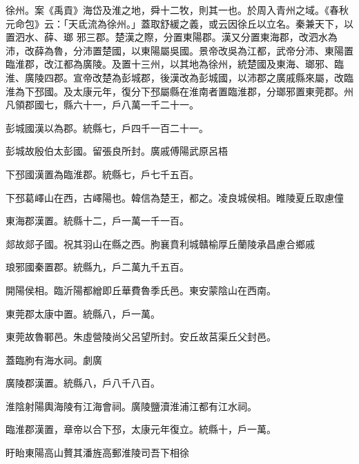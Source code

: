 \begin{pinyinscope}
 徐州。案《禹貢》海岱及淮之地，舜十二牧，則其一也。於周入青州之域。《春秋元命包》云：「天氐流為徐州。」蓋取舒緩之義，或云因徐丘以立名。秦兼天下，以置泗水、薛、瑯
 邪三郡。楚漢之際，分置東陽郡。漢又分置東海郡，改泗水為沛，改薛為魯，分沛置楚國，以東陽屬吳國。景帝改吳為江都，武帝分沛、東陽置臨淮郡，改江都為廣陵。及置十三州，以其地為徐州，統楚國及東海、瑯邪、臨淮、廣陵四郡。宣帝改楚為彭城郡，後漢改為彭城國，以沛郡之廣戚縣來屬，改臨淮為下邳國。及太康元年，復分下邳屬縣在淮南者置臨淮郡，分瑯邪置東莞郡。州凡領郡國七，縣六十一，戶八萬一千二十一。



 彭城國漢以為郡。統縣七，戶四千一百二十一。



 彭城故殷伯太彭國。留張良所封。廣戚傅陽武原呂梧



 下邳國漢置為臨淮郡。統縣七，戶七千五百。



 下邳葛嶧山在西，古嶧陽也。韓信為楚王，都之。凌良城侯相。睢陵夏丘取慮僮



 東海郡漢置。統縣十二，戶一萬一千一百。



 郯故郯子國。祝其羽山在縣之西。朐襄賁利城贛榆厚丘蘭陵承昌慮合鄉戚



 琅邪國秦置郡。統縣九，戶二萬九千五百。



 開陽侯相。臨沂陽都繒即丘華費魯季氏邑。東安蒙陰山在西南。



 東莞郡太康中置。統縣八，戶一萬。



 東莞故魯鄆邑。朱虛營陵尚父呂望所封。安丘故莒渠丘父封邑。



 蓋臨朐有海水祠。劇廣



 廣陵郡漢置。統縣八，戶八千八百。



 淮陰射陽輿海陵有江海會祠。廣陵鹽瀆淮浦江都有江水祠。



 臨淮郡漢置，章帝以合下邳，太康元年復立。統縣十，戶一萬。



 盱眙東陽高山贅其潘旌高郵淮陵司吾下相徐




\end{pinyinscope}
